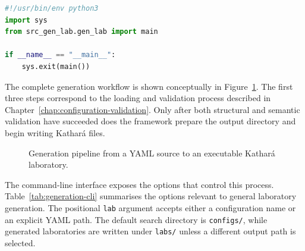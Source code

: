 \begin{lstlisting}[language=Python,caption={Command-line wrapper used to start the generator.},label={lst:generator-wrapper}]
#!/usr/bin/env python3
import sys
from src_gen_lab.gen_lab import main

if __name__ == "__main__":
    sys.exit(main())
\end{lstlisting}

The complete generation workflow is shown conceptually in
Figure~\ref{fig:generation-pipeline}. The first three steps correspond to the
loading and validation process described in Chapter~\ref{chap:configuration-validation}.
Only after both structural and semantic validation have succeeded does the
framework prepare the output directory and begin writing Kathar\'a files.

\begin{figure}[htbp]
\centering
{}
\caption{Generation pipeline from a YAML source to an executable Kathar\'a laboratory.}
\label{fig:generation-pipeline}
\end{figure}

The command-line interface exposes the options that control this process.
Table~\ref{tab:generation-cli} summarises the options relevant to general
laboratory generation. The positional \texttt{lab} argument accepts either a
configuration name or an explicit YAML path. The default search directory is
\texttt{configs/}, while generated laboratories are written under
\texttt{labs/} unless a different output path is selected.


